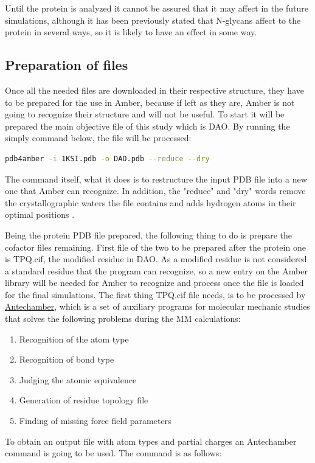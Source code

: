 \documentclass[a4paper]{article}
\begin{document}
Until the protein is analyzed it cannot be assured that it may affect in the future simulations, although it has been previously stated that N-glycans affect to the protein in several ways, so it is likely to have an effect in some way.

\subsection{Preparation of files}

Once all the needed files are downloaded in their respective structure, they have to be prepared for the use in Amber, because if left as they are, Amber is not going to recognize their structure and will not be useful. To start it will be prepared the main objective file of this study which is DAO. By running the simply command below, the file will be processed:

\begin{lstlisting}[language=Bash,caption={Preparing a pdb file to be used in \texttt{Amber}}]
    pdb4amber -i 1KSI.pdb -o DAO.pdb --reduce --dry
\end{lstlisting}


The command itself, what it does is to restructure the input PDB file into a new one that Amber can recognize. In addition, the "reduce" and "dry" words remove the crystallographic waters the file contains and adds hydrogen atoms in their optimal positions \cite{Amber23}.

Being the protein PDB file prepared, the following thing to do is prepare the cofactor files remaining. First file of the two to be prepared after the protein one is TPQ.cif, the modified residue in DAO. As a modified residue is not considered a standard residue that the program can recognize, so a new entry on the Amber library will be needed for Amber to recognize and process once the file is loaded for the final simulations.
The first thing TPQ.cif file needs, is to be processed by \href{https://ambermd.org/antechamber/ac.html}{Antechamber}, which is a set of auxiliary programs for molecular mechanic studies that solves the following problems during the MM calculations:
\begin{enumerate}
    \item Recognition of the atom type
    \item Recognition of bond type
    \item Judging the atomic equivalence
    \item Generation of residue topology file
    \item Finding of missing force field parameters
\end{enumerate}
To obtain an output file with atom types and partial charges an Antechamber command is going to be used. The command is as follows:
\end{document}
